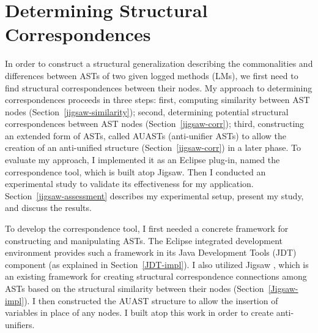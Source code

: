 \chapter{Determining Structural Correspondences}\label{background2}
In order to construct a structural generalization describing the commonalities and differences between ASTs of two given logged methods (LMs), we first need to find structural correspondences between their nodes. My approach to determining correspondences proceeds in three steps: first, computing similarity between AST nodes (Section~\ref{jigsaw-similarity}); second, determining potential structural correspondences between AST nodes (Section~\ref{jigsaw-corr}); third, constructing an extended form of ASTs, called AUASTs (anti-unifier ASTs) to allow the creation of an anti-unified structure (Section~\ref{jigsaw-corr}) in a later phase. To evaluate my approach, I implemented it as an Eclipse plug-in, named the correspondence tool, which is built atop Jigsaw. Then I conducted an experimental study to validate its effectiveness for my application. Section~\ref{jigsaw-assessment} describes my experimental setup, present my study, and discuss the results.

To develop the correspondence tool, I first needed a concrete framework for constructing and manipulating ASTs. The Eclipse integrated development environment provides such a framework in its Java Development Tools (JDT) component (as explained in Section~\ref{JDT-impl}). I also utilized Jigsaw \cite{2008:fse:cottrell}, which is an existing framework for creating structural correspondence connections among ASTs based on the structural similarity between their nodes (Section~\ref{Jigsaw-impl}). I then constructed the AUAST structure to allow the insertion of variables in place of any nodes. I built atop this work in order to create anti-unifiers.





